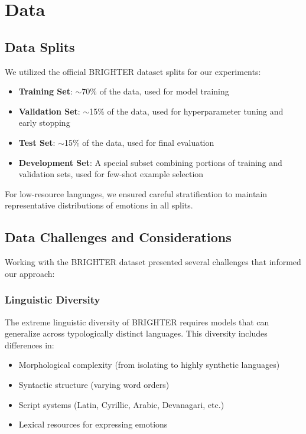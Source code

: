 \documentclass[a4paper,12pt]{extarticle}
\begin{document}
\section{Data}

\subsection{Data Splits}

We utilized the official BRIGHTER dataset splits for our experiments:

\begin{itemize}
\item \textbf{Training Set}: $\sim$70\% of the data, used for model training
\item \textbf{Validation Set}: $\sim$15\% of the data, used for hyperparameter tuning and early stopping
\item \textbf{Test Set}: $\sim$15\% of the data, used for final evaluation
\item \textbf{Development Set}: A special subset combining portions of training and validation sets, used for few-shot example selection
\end{itemize}

For low-resource languages, we ensured careful stratification to maintain representative distributions of emotions in all splits.

\subsection{Data Challenges and Considerations}

Working with the BRIGHTER dataset presented several challenges that informed our approach:

\subsubsection{Linguistic Diversity}

The extreme linguistic diversity of BRIGHTER requires models that can generalize across typologically distinct languages. This diversity includes differences in:
\begin{itemize}
\item Morphological complexity (from isolating to highly synthetic languages)
\item Syntactic structure (varying word orders)
\item Script systems (Latin, Cyrillic, Arabic, Devanagari, etc.)
\item Lexical resources for expressing emotions
\end{itemize}
\end{document}
